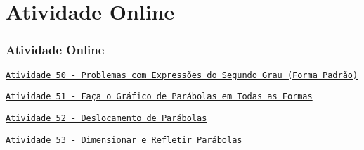 \section{Atividade Online}
\begin{frame}
\frametitle{Atividade Online} 

\href{https://pt.khanacademy.org/math/algebra-home/alg-quadratics/quad-standard-form-alg/e/key-features-quadratics}
{{\tt Atividade 50 - Problemas com Expressões do Segundo Grau (Forma
Padrão)}}

\href{https://pt.khanacademy.org/math/algebra-home/alg-quadratics/alg-features-of-quadratic-functions/e/graphing_parabolas_2}
{{\tt Atividade 51 - Faça o Gráfico de Parábolas em Todas as
Formas}}

\href{https://pt.khanacademy.org/math/algebra-home/alg-quadratics/alg-transforming-quadratic-functions/e/shift-parabolas}
{{\tt Atividade 52 - Deslocamento de Parábolas}}

\href{https://pt.khanacademy.org/math/algebra-home/alg-quadratics/alg-transforming-quadratic-functions/e/stretch-and-shrink-parabolas}
{{\tt Atividade 53 - Dimensionar e Refletir Parábolas}}



\end{frame}

